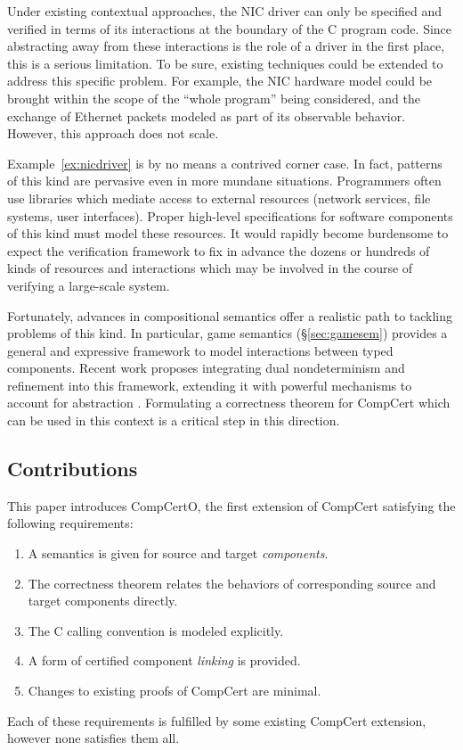 \documentclass[sigplan,screen,review]{acmart}
\begin{document}
Under existing contextual approaches,
the NIC driver can only be specified and verified in terms of
its interactions at the boundary of the C program code.
Since abstracting away from these interactions
is the role of a driver in the first place,
this is a serious limitation.
%
To be sure,
existing techniques could be extended
to address this specific problem.
For example,
the NIC hardware model could be brought
within the scope of the ``whole program'' being considered,
and the exchange of Ethernet packets
modeled as part of its observable behavior.
However, this approach does not scale.

Example~\ref{ex:nicdriver}
is by no means a contrived corner case.
In fact, patterns of this kind are pervasive even in more mundane situations.
Programmers often use libraries
which mediate access to external resources
(network services, file systems, user interfaces).
Proper high-level specifications
for software components of this kind
must model these resources.
It would rapidly become burdensome to expect
the verification framework
to fix in advance
the dozens or hundreds
of kinds of resources and interactions
which may be involved
in the course of verifying a large-scale system.

Fortunately,
advances in compositional semantics
offer a realistic path
to tackling problems of this kind.
In particular,
game semantics (\S\ref{sec:gamesem})
provides a general and expressive framework
to model interactions between typed components.
Recent work proposes integrating
dual nondeterminism and refinement
into this framework,
extending it with powerful mechanisms
to account for abstraction \cite{rbgs-cal}.
Formulating
a correctness theorem for CompCert
which can be used in this context
is a critical step in this direction.


\subsection{Contributions} \label{sec:compcertreq} %

This paper introduces CompCertO,
the first extension of CompCert
satisfying the following requirements:
\begin{enumerate}
\item \label{req:opensem}
  A semantics is given for
  source and target \emph{components}.
\item \label{req:opensim}
  The correctness theorem relates
  the behaviors of corresponding
  source and target components directly.
\item \label{req:openabs}
  The C calling convention is modeled explicitly.
\item \label{req:linking}
  A form of certified component \emph{linking}
  is provided.
\item \label{req:complexity}
  Changes to existing proofs of CompCert
  are minimal.
\end{enumerate}
Each of these requirements is fulfilled
by some existing CompCert extension,
however none satisfies them all.
\end{document}
